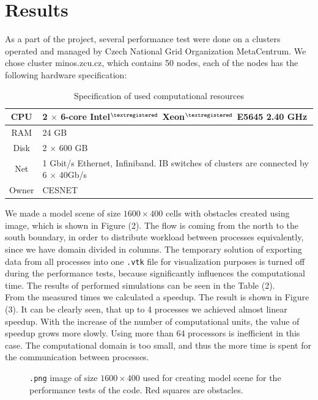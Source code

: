 \documentclass[a4paper, 10pt]{article}
\begin{document}
\section{Results}
As a part of the project, several performance test were done on a clusters operated and managed by Czech National Grid Organization MetaCentrum. We chose cluster minos.zcu.cz, which contains 50 nodes, each of the nodes has the following hardware specification:

\begingroup
\renewcommand*{\arraystretch}{1.5}
\begin{table}[h!]
	\centering
	\begin{tabular}{ | c | l | }
		\hline
		CPU & 2 $ \times $ 6-core Intel$ ^{{\scriptsize \textregistered}} $ Xeon$ ^{{\scriptsize \textregistered}} $ E5645 2.40 GHz \\ \hline
		RAM & 24 GB \\ \hline
		Disk & 2 $ \times $ 600 GB \\ \hline
		Net & 1 Gbit/s Ethernet, Infiniband. IB switches of clusters are connected by 6 $ \times $ 40Gb/s \\ \hline
		Owner & CESNET \\
		\hline
	\end{tabular}
	\caption{Specification of used computational resources}
	\label{2.3.16}
\end{table}
\endgroup

We made a model scene of size $ 1600 \times 400 $ cells with obstacles created using image, which is shown in Figure (2). The flow is coming from the north to the south boundary, in order to distribute workload between processes equivalently, since we have domain divided in columns. The temporary solution of exporting data from all processes into one \texttt{.vtk} file for visualization purposes is turned off during the performance tests, because significantly influences the computational time. The results of performed simulations can be seen in the Table (2).\\

From the measured times we calculated a speedup. The result is shown in Figure (3). It can be clearly seen, that up to 4 processes we achieved almost linear speedup. With the increase of the number of computational units, the value of speedup grows more slowly. Using more than 64 processors is inefficient in this case. The computational domain is too small, and thus the more time is spent for the communication between processes.

\begin{figure}[h!]
	\centering
	\caption{\texttt{.png} image of size $ 1600 \times 400 $ used for creating model scene for the performance tests of the code. Red squares are obstacles.}
\end{figure}
\end{document}
